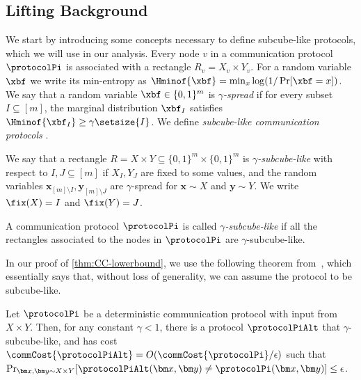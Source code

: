 \subsection{Lifting Background}
 We start by introducing some concepts necessary to define subcube-like protocols, which we will use in our analysis.
Every node $v$ in a communication protocol $\protocolPi$ is associated with a rectangle $R_v = X_v \times Y_v$. 
For a random variable $\xbf$ we write its min-entropy as $\Hminof{\xbf}=\min_x \log (1/\Pr[\xbf = x])$. We say that a random variable $\xbf \in \{0,1\}^m$ is \emph{$\gamma$-spread} 
if for every subset $I\subseteq [m]$, the marginal distribution $\xbf_I$ satisfies $\Hminof{\xbf_I}\geq \gamma \setsize{I}$. We define \emph{subcube-like communication protocols} \cite{GoosGJL2025quantum,RiazanovSSY2025searching}.

\begin{definition}
    We say that a rectangle $R=X\times Y \subseteq \{0,1\}^m \times \{0,1\}^m$ is \emph{$\gamma$-subcube-like} with respect to $I,J \subseteq [m]$ if $X_I, Y_J$ are fixed to some values, and the random variables $\bm x_{[m]\setminus I},\bm y_{[m]\setminus J}$ are $\gamma$-spread for $\bm x \sim X$ and $\bm y \sim Y$. We write $\fix (X)=I$ and $\fix (Y)=J$.

    A communication protocol $\protocolPi$ is called \emph{$\gamma$-subcube-like} if all the rectangles associated to the nodes in $\protocolPi$ are $\gamma$-subcube-like.
\end{definition}

In our proof of \cref{thm:CC-lowerbound}, we use the following theorem from~\cite{GoosGJL2025quantum}, which essentially says that, without loss of generality, we can assume the protocol to be subcube-like. 

\begin{theorem}\label{thm:ggjl-cleanup}
Let $\protocolPi$ be a deterministic communication protocol with input from $X \times Y$. Then, for any constant $\gamma<1$, there is a protocol $\protocolPiAlt$ that  $\gamma$-subcube-like, and has cost $\commCost{\protocolPiAlt}=O(\commCost{\protocolPi}/\epsilon)$ such that $\Pr_{\bm x, \bm y \sim X \times Y}[\protocolPiAlt(\bm x, \bm y) \neq \protocolPi(\bm x, \bm y)] \le \epsilon$. 
\end{theorem}

